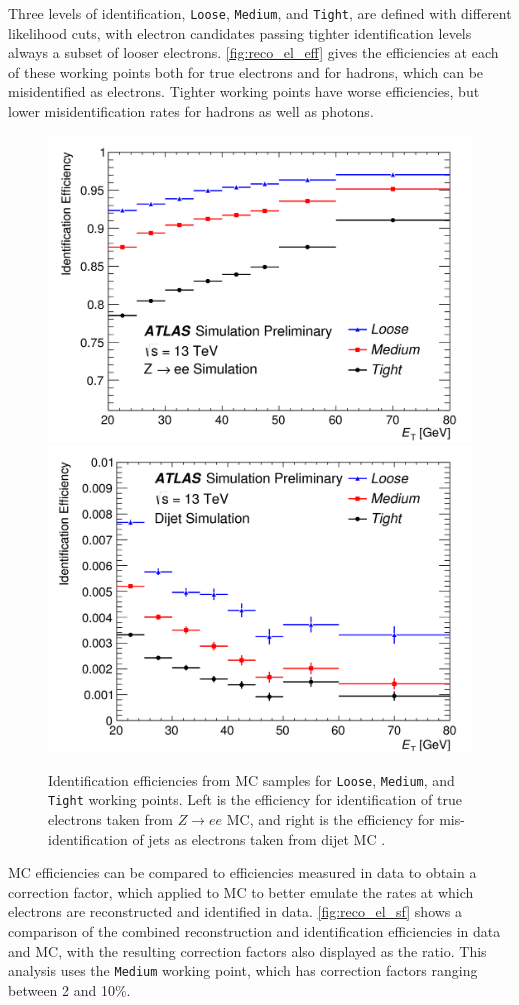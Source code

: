 Three levels of identification, \texttt{Loose}, \texttt{Medium}, and \texttt{Tight}, are defined with different likelihood cuts, with electron candidates passing tighter identification levels always a subset of looser electrons. \autoref{fig:reco_el_eff} gives the efficiencies at each of these working points both for true electrons and for hadrons, which can be misidentified as electrons. Tighter working points have worse efficiencies, but lower misidentification rates for hadrons as well as photons. 

\begin{centering}
\begin{figure}[!hbt]
\myfloatalign
\includegraphics[width=.48\linewidth]{figures/reco/fig_01a.png}
\includegraphics[width=.48\linewidth]{figures/reco/fig_01b.png}
\caption{ Identification efficiencies from \ac{MC} samples for \texttt{Loose}, \texttt{Medium}, and \texttt{Tight} working points. Left is the efficiency for identification of true electrons taken from $Z\rightarrow ee$ \ac{MC}, and right is the efficiency for mis-identification of jets as electrons taken from dijet \ac{MC} \cite{ATLAS-CONF-2016-024}.}
\label{fig:reco_el_eff}
\end{figure}
\end{centering}

\ac{MC} efficiencies can be compared to efficiencies measured in data to obtain a correction factor, which applied to \ac{MC} to better emulate the rates at which electrons are reconstructed and identified in data. \autoref{fig:reco_el_sf} shows a comparison of the combined reconstruction and identification efficiencies in data and \ac{MC}, with the resulting correction factors also displayed as the ratio. This analysis uses the \texttt{Medium} working point, which has correction factors ranging between 2 and 10\%. 

